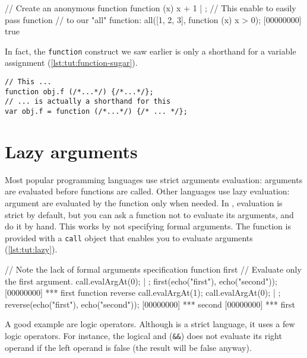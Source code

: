\begin{urbiscript}[caption=Lambda function, label=lst:tut:lambda, name=all]
// Create an anonymous function
function (x) {x + 1} | {};
// This enable to easily pass function
// to our "all" function:
all([1, 2, 3], function (x) { x > 0});
[00000000] true
\end{urbiscript}

In fact, the \lstinline{function} construct we saw earlier is only a
shorthand for a variable assignment (\autoref{lst:tut:function-sugar}).

\begin{lstlisting}[caption=The function sugar,
  label=lst:tut:function-sugar]
// This ...
function obj.f (/*...*/) {/*...*/};
// ... is actually a shorthand for this
var obj.f = function (/*...*/) {/* ... */};
\end{lstlisting}

\section{Lazy arguments}

Most popular programming languages use strict arguments evaluation:
arguments are evaluated before functions are called. Other languages
use lazy evaluation: argument are evaluated by the function only when
needed. In \us, evaluation is strict by default, but you can ask a
function not to evaluate its arguments, and do it by hand. This works
by not specifying formal arguments. The function is provided with a
\lstinline{call} object that enables you to evaluate arguments
(\autoref{lst:tut:lazy}).

\begin{urbiscript}[caption=Tweaking arguments evaluation,
  label=lst:tut:lazy]
// Note the lack of formal arguments specification
function first
{
  // Evaluate only the first argument.
  call.evalArgAt(0);
} | {};
first(echo("first"), echo("second"));
[00000000] *** first
function reverse
{
  call.evalArgAt(1);
  call.evalArgAt(0);
} | {};
reverse(echo("first"), echo("second"));
[00000000] *** second
[00000000] *** first
\end{urbiscript}

A good example are logic operators. Although \Cxx is a strict
language, it uses a few logic operators. For instance, the logical and
(\lstinline{&&}) does not evaluate its right operand if the left
operand is false (the result will be false anyway).

